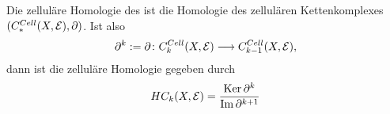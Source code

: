 \begin{definition}
    Die zelluläre Homologie des ist die Homologie des zellulären Kettenkomplexes 
    $(C^{Cell}_{\ast}(X, \mathcal{E}), { \partial })$.
    Ist also
    \[ { \partial }^k := { \partial } \colon C^{Cell}_k(X, \mathcal{E}) \longrightarrow C^{Cell}_{k - 1}(X, \mathcal{E}) , \]
    dann ist die zelluläre Homologie gegeben durch 
    \[ HC_k (X, \mathcal{E}) = \frac{ { \operatorname{Ker} } \, { \partial }^k }{ { \operatorname{Im} } \, { \partial }^{k + 1} } \]
\end{definition}
